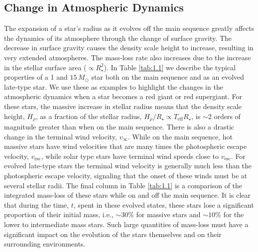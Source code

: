 \subsection{Change in Atmospheric Dynamics}\label{sec:1.5.1}
The expansion of a star's radius as it evolves off the main sequence greatly affects the dynamics of its atmosphere through the change of surface gravity. The decrease in surface gravity causes the density scale height to increase, resulting in very extended atmospheres. The mass-loss rate also increases due to the increase in the stellar surface area ($\propto R_{\star}^2$). In Table \ref{tab:1.1} we describe the typical properties of a 1 and $15\,M_{\odot}$ star both on the main sequence and as an evolved late-type star. We use these as examples to highlight the changes in the atmospheric dynamics when a star becomes a red giant or red supergiant. For these stars, the massive increase in stellar radius means that the density scale height, $H_{\rho}$, as a fraction of the stellar radius, $H_{\rho}/R_{\star} \propto T_{\mathrm{eff}}R_{\star}$, is $\sim 2$ orders of magnitude greater than when on the main sequence. There is also a drastic change in the terminal wind velocity, $v_{\infty}$. While on the main sequence, hot massive stars have wind velocities that are many times the photospheric escape velocity, $v_{\mathrm{esc}}$, while solar type stars have terminal wind speeds close to $v_{\mathrm{esc}}$. For evolved late-type stars the terminal wind velocity is generally much less than the photospheric escape velocity, signaling that the onset of these winds must be at several stellar radii. The final column in Table \ref{tab:1.1} is a comparison of the integrated mass-loss of these stars while on and off the main sequence. It is clear that during the time, $t$, spent in these evolved states, these stars lose a significant proportion of their initial mass, i.e., $\sim 30\%$ for massive stars and $\sim 10\%$ for the lower to intermediate mass stars. Such large quantities of mass-loss must have a significant impact on the evolution of the stars themselves and on their surrounding environments.


